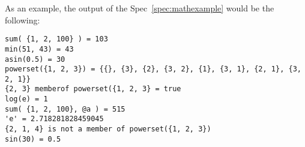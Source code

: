 \documentclass{article}
\begin{document}
As an example, the output of the \CoreASM Spec~\ref{spec:mathexample} would be the following:

\newenvironment{shell}
	{\noindent \color{shellgray}\vspace{0.2cm} \begin{minipage}{0.9\textwidth} \vspace{0.2cm}}
	{\vspace{0.2cm} \end{minipage} \vspace{0.2cm} \color{black}}

\begin{shell}
\begin{verbatim}
sum( {1, 2, 100} ) = 103
min(51, 43) = 43
asin(0.5) = 30
powerset({1, 2, 3}) = {{}, {3}, {2}, {3, 2}, {1}, {3, 1}, {2, 1}, {3, 2, 1}}
{2, 3} memberof powerset({1, 2, 3} = true
log(e) = 1
sum( {1, 2, 100}, @a ) = 515
'e' = 2.718281828459045
{2, 1, 4} is not a member of powerset({1, 2, 3})
sin(30) = 0.5
\end{verbatim}
\end{shell}

\printindex
\end{document}
